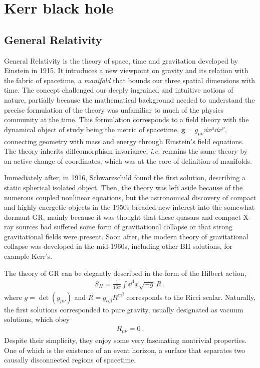 
\chapter{Kerr black hole} %
\label{Chapter2}


\section{General Relativity}

General Relativity is the theory of space, time and gravitation developed by Einstein in 1915. 
It introduces a new viewpoint on gravity and its relation with the fabric of spacetime, a \emph{manifold} that bounds our three spatial dimensions with time.
The concept challenged our deeply ingrained and intuitive notions of nature, partially because the mathematical background needed to understand the precise formulation of the theory was unfamiliar to much of the physics community at the time.
This formulation corresponds to a field theory with the dynamical object of study being the metric of spacetime, $\bm{g}=g_{\mu\nu} \dd x^\mu \dd x^\nu$, connecting geometry with mass and energy through Einstein's field equations.
The theory inherits diffeomorphism invariance, \emph{i.e.} remains the same theory by an active change of coordinates, which was at the core of definition of manifolds.

Immediately after, in 1916, Schwarzschild found the first solution, describing a static spherical isolated object.
Then, the theory was left aside because of the numerous coupled nonlinear equations, but the astronomical discovery of compact and highly energetic objects in the 1950s breaded new interest into the somewhat dormant GR, mainly because it was thought that these quasars and compact X-ray sources had suffered some form of gravitational collapse or that strong gravitational fields were present.
Soon after, the modern theory of gravitational collapse was developed in the mid-1960s, including other BH solutions, for example Kerr's.

The theory of GR can be elegantly described in the form of the Hilbert action,
\begin{align}
    S_{H} = \frac{1}{16\pi} \int \dd^4 x \sqrt{-g} \,R ~,
    \label{eq2:actionGR}
\end{align}
where $g=\det(g_{\mu\nu})$ and $R=g_{\alpha\beta} R^{\alpha\beta}$ corresponds to the Ricci scalar.
Naturally, the first solutions corresponded to pure gravity, usually designated as vacuum solutions, which obey
\begin{align}
    R_{\mu\nu} = 0 ~.
    \label{eq2:vacuumGR}
\end{align}
Despite their simplicity, they enjoy some very fascinating nontrivial properties. 
One of which is the existence of an event horizon, a surface that separates two causally disconnected regions of spacetime.

